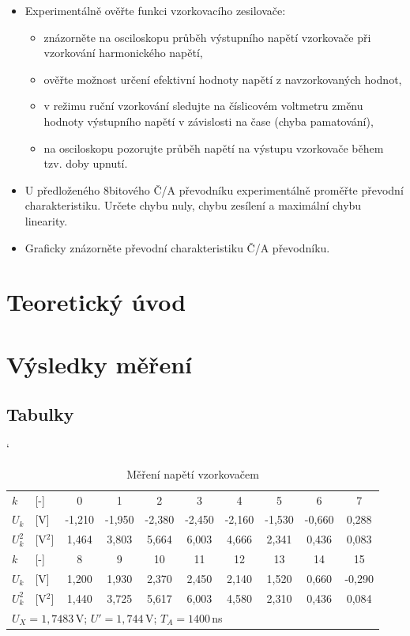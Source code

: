 \documentclass[a4paper, czech]{article}
\begin{document}
\begin{itemize}
    \item Experimentálně ověřte funkci vzorkovacího zesilovače:
    \begin{itemize}
        \item znázorněte na osciloskopu průběh výstupního napětí vzorkovače při vzorkování harmonického napětí,
        \item ověřte možnost určení efektivní hodnoty napětí z navzorkovaných hodnot,
        \item v režimu ruční vzorkování sledujte na číslicovém voltmetru změnu hodnoty výstupního napětí v závislosti na čase (chyba pamatování),
        \item na osciloskopu pozorujte průběh napětí na výstupu vzorkovače během tzv. doby upnutí.
    \end{itemize}
    \item U předloženého 8bitového Č/A převodníku experimentálně proměřte převodní charakteristiku. Určete chybu nuly, chybu zesílení a maximální chybu linearity.
    \item Graficky znázorněte převodní charakteristiku Č/A převodníku.
\end{itemize}

\section{Teoretický úvod}

\section{Výsledky měření}

\subsection{Tabulky}

\begin{table}[H]
    \catcode`
    \centering
    \caption{Měření napětí vzorkovačem}
    \begin{tabular}{ll|cccccccc}
        \toprule
        $k$   & [-]  & 0      & 1      & 2      & 3      & 4      & 5      & 6      & 7     \\
        \cmidrule(rl){1-10}
        $U_k$  &  [V]  & -1,210 & -1,950 & -2,380 & -2,450 & -2,160 & -1,530 & -0,660 & 0,288 \\
        $U_k^2$ & [V$^2$] & 1,464  & 3,803  & 5,664  & 6,003  & 4,666  & 2,341  & 0,436  & 0,083 \\
        \midrule
        \midrule
        $k$   & [-]  &8     & 9     & 10    & 11    & 12    & 13    & 14    & 15     \\
        \cmidrule(rl){1-10}
        $U_k$  & [V]  &1,200 & 1,930 & 2,370 & 2,450 & 2,140 & 1,520 & 0,660 & -0,290 \\
        $U_k^2$ & [V$^2$] &1,440 & 3,725 & 5,617 & 6,003 & 4,580 & 2,310 & 0,436 & 0,084 \\
        \bottomrule
        \multicolumn{10}{l}{$U_X = 1,7483$\,V; $U' = 1,744$\,V; $T_A = 1400$\,ns}
    \end{tabular}
\end{table}
\end{document}
